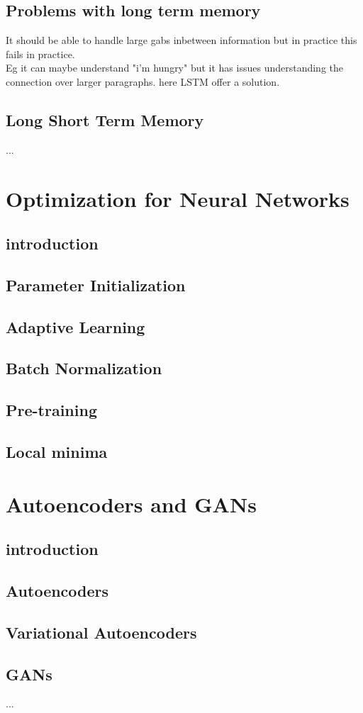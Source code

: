 \documentclass[a4paper,10pt,titlepage]{report}
\begin{document}
\subsection{Problems with long term memory}
It should be able to handle large gabs inbetween information but in practice this fails in practice.\\
Eg it can maybe understand "i'm hungry" but it has issues understanding the connection over larger paragraphs. here LSTM offer a solution.
\subsection{Long Short Term Memory}%
...

\newpage
\section{Optimization for Neural Networks}
\subsection{introduction}
\subsection{Parameter Initialization}
\subsection{Adaptive Learning}
\subsection{Batch Normalization}
\subsection{Pre-training}
\subsection{Local minima}

\newpage
\section{Autoencoders and GANs}
\subsection{introduction}
\subsection{Autoencoders}
\subsection{Variational Autoencoders}
\subsection{GANs}
...
\end{document}
